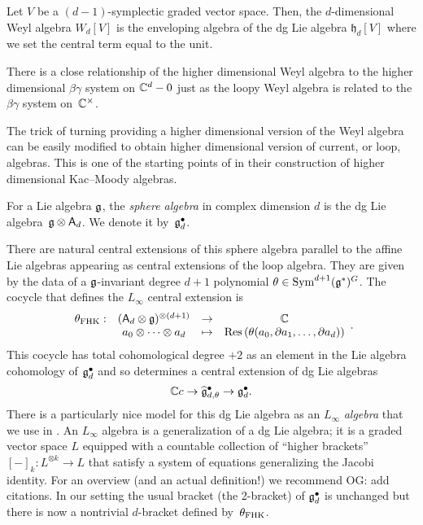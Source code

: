 \documentclass[11pt]{amsart}
\def\lie#1{\ensuremath{\mathfrak{#1}}}
\def\owen#1{{\textcolor{violet!50!black}{OG: {#1}}}}
\begin{document}
\begin{dfn}
Let $V$ be a $(d-1)$-symplectic graded vector space. 
Then, the $d$-dimensional Weyl algebra $W_d[V]$ is the enveloping algebra of the dg Lie algebra $\lie{h}_d [V]$ where we set the central term equal to the unit.
\end{dfn}

There is a close relationship of the higher dimensional Weyl algebra to the higher dimensional $\beta\gamma$ system on $\mathbb C^d - 0$ just as the loopy Weyl algebra is related to the $\beta\gamma$ system on~$\mathbb C^\times$. 

The trick of turning providing a higher dimensional version of the Weyl algebra can be easily modified to obtain higher dimensional version of current, or loop, algebras. 
This is one of the starting points of \cite{FHK} in their construction of higher dimensional Kac--Moody algebras. 

\begin{dfn}
\label{dfn:sphere}
For a Lie algebra $\mathfrak g$, the {\em sphere algebra} in complex dimension $d$ is the dg Lie algebra~$\mathfrak g \otimes \mathsf A_d$.
We denote it by~$\mathfrak g^\bullet_d$.
\end{dfn}

There are natural central extensions of this sphere algebra 
parallel to the affine Lie algebras appearing as central extensions of the loop algebra.
They are given by the data of a $\mathfrak g$-invariant degree $d+1$ polynomial $\theta \in \operatorname{Sym}^{d+1}(\mathfrak g^*)^G$.
The cocycle that defines the $L_\infty$ central extension is
\[
\label{fhk cocycle}
\begin{array}{cccc}
\theta_{\rm FHK} : & (\mathsf A_d \otimes \mathfrak g)^{\otimes (d+1)} & \to & \mathbb C\\ 
& a_0 \otimes \cdots \otimes a_d & \mapsto & {\rm Res} \left(\theta(a_0,\partial a_1,\ldots,\partial a_d)\right)
\end{array}.
\]
This cocycle has total cohomological degree $+2$ as an element in the Lie algebra cohomology of $\mathfrak g^\bullet_{d}$ and so determines a central extension of dg Lie algebras
\[
\mathbb C c \to \widehat{\mathfrak g}^\bullet_{d, \theta} \to \mathfrak g^\bullet_d .
\]
There is a particularly nice model for this dg Lie algebra as an $L_\infty$ \textit{algebra} that we use in \cite{GWkm}.
An $L_\infty$ algebra is a generalization of a dg Lie algebra;
it is a graded vector space $L$ equipped with a countable collection of ``higher brackets'' $[-]_k \colon L^{\otimes k} \to L$ that satisfy a system of equations generalizing the Jacobi identity.
For an overview (and an actual definition!) we recommend \owen{add citations}.
In our setting the usual bracket (the 2-bracket) of $\mathfrak g^\bullet_d$ is unchanged but there is now a nontrivial $d$-bracket defined by~$\theta_{\rm FHK}$.
\end{document}
